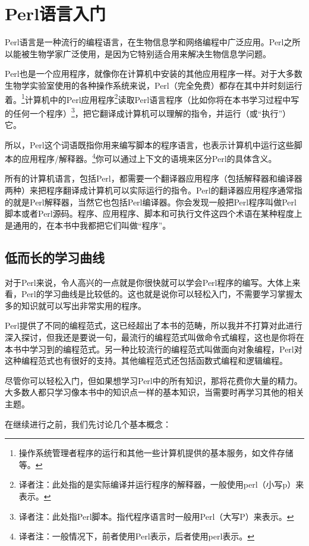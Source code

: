 \chapter{Perl语言入门}
\label{chap:chapter2}
\minitoc

Perl语言是一种流行的编程语言，在生物信息学和网络编程中广泛应用。Perl之所以能被生物学家广泛使用，是因为它特别适合用来解决生物信息学问题。

Perl也是一个应用程序，就像你在计算机中安装的其他应用程序一样。对于大多数生物学实验室使用的各种操作系统来说，Perl（完全免费）都存在其中并时刻运行着。\footnote{操作系统管理者程序的运行和其他一些计算机提供的基本服务，如文件存储等。}计算机中的Perl应用程序\footnote{译者注：此处指的是实际编译并运行程序的解释器，一般使用perl（小写p）来表示。}读取Perl语言程序（比如你将在本书学习过程中写的任何一个程序）\footnote{译者注：此处指Perl脚本。指代程序语言时一般用Perl（大写P）来表示。}，把它翻译成计算机可以理解的指令，并运行（或“执行”）它。

所以，Perl这个词语既指你用来编写脚本的程序语言，也表示计算机中运行这些脚本的应用程序/解释器。\footnote{译者注：一般情况下，前者使用Perl表示，后者使用perl表示。}你可以通过上下文的语境来区分Perl的具体含义。

所有的计算机语言，包括Perl，都需要一个翻译器应用程序（包括解释器和编译器两种）来把程序翻译成计算机可以实际运行的指令。Perl的翻译器应用程序通常指的就是Perl解释器，当然它也包括Perl编译器。你会发现一般把Perl程序叫做Perl脚本或者Perl源码。程序、应用程序、脚本和可执行文件这四个术语在某种程度上是通用的，在本书中我都把它们叫做“程序”。

\section{低而长的学习曲线}
对于Perl来说，令人高兴的一点就是你很快就可以学会Perl程序的编写。大体上来看，Perl的学习曲线是比较低的。这也就是说你可以轻松入门，不需要学习掌握太多的知识就可以写出非常实用的程序。

Perl提供了不同的编程范式，这已经超出了本书的范畴，所以我并不打算对此进行深入探讨，但我还是要说一句，最流行的编程范式叫做命令式编程，这也是你将在本书中学习到的编程范式。另一种比较流行的编程范式叫做面向对象编程，Perl对这种编程范式也有很好的支持。其他编程范式还包括函数式编程和逻辑编程。

尽管你可以轻松入门，但如果想学习Perl中的所有知识，那将花费你大量的精力。大多数人都只学习像本书中的知识点一样的基本知识，当需要时再学习其他的相关主题。

在继续进行之前，我们先讨论几个基本概念：

